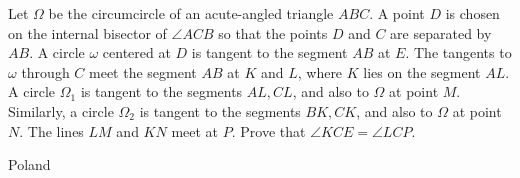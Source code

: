 Let $\Omega$  be the circumcircle of an acute-angled triangle $ABC$. A point $D$ is chosen on the internal bisector of $\angle ACB$ so that the points $D$ and $C$ are separated by $AB$. A circle $\omega$ centered at $D$ is tangent to the segment $AB$ at $E$. The tangents to $\omega$ through $C$ meet the segment $AB$ at $K$ and $L$, where $K$ lies on the segment $AL$. A circle  $\Omega_1$ is tangent to the segments $AL, CL$, and also to $\Omega$ at point $M$. Similarly, a circle $\Omega_2$ is tangent to the segments $BK, CK$, and also to  $\Omega$ at point $N$. The lines $LM$ and $KN$ meet at $P$. Prove that $\angle KCE = \angle LCP$.

Poland